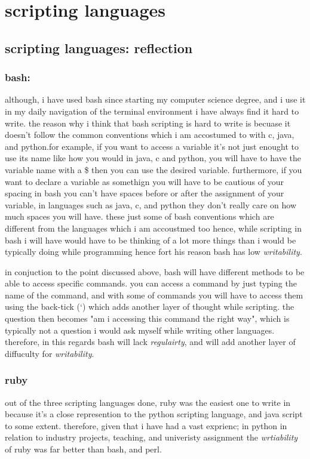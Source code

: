 \documentclass[
	12pt, %
]{fphw}
\begin{document}
\section{scripting languages}


\subsection{scripting languages: reflection}

\subsubsection{bash:} although, i have used bash since starting my computer science
degree, and i use it in my daily navigation of the terminal environment i have
always find it hard to write. the reason why i think that bash scripting is hard
to write is becuase it doesn't follow the common conventions which i am accostumed
to with c, java, and python.for example, if you want to access a variable it's not
just enought to use its name like how you would in java, c and python, you will have
to have the variable name with a \$ then you can use the desired variable. furthermore,
if you want to declare a variable as somethign you will have to be cautious of your
spacing in bash you can't have spaces before or after the assignment of your variable,
in languages such as java, c, and python they don't really care on how much spaces you
will have. these just some of bash conventions which are different from the
languages which i am accoustmed too hence, while scripting in bash i will have
would have to be thinking of a lot more things than i would be typically doing
while programming hence fort his reason bash has low \emph{writability}. \par

in conjuction to the point discussed above, bash will have different methods to
be able to access specific commands. you can access a command by just typing
the name of the command, and with some of commands you will have to access them
using the back-tick (`) which adds another layer of thought  while scripting.
the question then becomes "am i accessing this command the right way", which is
typically not a question i would ask myself while writing other languages.
therefore, in this regards bash will lack \emph{regulairty}, and will add another
layer of diffuculty for \emph{writability}.


\subsubsection{ruby} out of the three scripting languages done, ruby was the
easiest one to write in because it's a close represention to the python scripting
language, and java script to some extent. therefore, given that i have had a
vast exprienc; in python in relation to industry projects, teaching, and
univeristy assignment the \emph{wrtiability} of ruby was far better than bash,
and perl.\par
\end{document}
